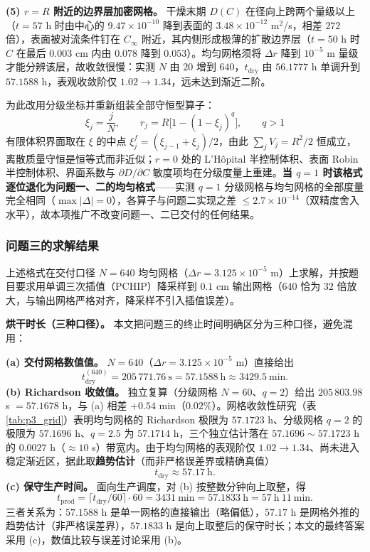 \textbf{(5) $r=R$ 附近的边界层加密网格。} 干燥末期 $D(C)$ 在径向上跨两个量级以上（$t=57$ h 时由中心的 $9.47\times10^{-10}$ 降到表面的 $3.48\times10^{-12}$ m$^2$/s，相差 $272$ 倍），表面被对流条件钉在 $C_\infty$ 附近，其内侧形成极薄的扩散边界层（$t=50$ h 时 $C$ 在最后 $0.003$ cm 内由 $0.078$ 降到 $0.053$）。均匀网格须将 $\Delta r$ 降到 $10^{-5}$ m 量级才能分辨该层，故收敛很慢：实测 $N$ 由 $20$ 增到 $640$，$t_{\text{dry}}$ 由 $56.1777$ h 单调升到 $57.1588$ h，表观收敛阶仅 $1.02\to1.34$，远未达到渐近二阶。

为此改用分级坐标并重新组装全部守恒型算子：
\begin{equation}
  \xi_j=\frac{j}{N},\qquad r_j=R\big[1-(1-\xi_j)^q\big],\qquad q>1
  \label{eq:p3_grid}
\end{equation}
有限体积界面取在 $\xi$ 的中点 $\xi^f_j=(\xi_{j-1}+\xi_j)/2$，由此 $\sum_jV_j=R^2/2$ 恒成立，离散质量守恒是恒等式而非近似；$r=0$ 处的 L'Hôpital 半控制体积、表面 Robin 半控制体积、界面系数与 $\partial D/\partial C$ 敏度项均在分级度量上重建。\textbf{当 $q=1$ 时该格式逐位退化为问题一、二的均匀格式}——实测 $q=1$ 分级网格与均匀网格的全部度量完全相同（$\max|\Delta|=0$），各算子与问题二实现之差 $\le2.7\times10^{-14}$（双精度舍入水平），故本项推广不改变问题一、二已交付的任何结果。

\subsubsection{问题三的求解结果}

上述格式在交付口径 $N=640$ 均匀网格（$\Delta r=3.125\times10^{-5}$ m）上求解，并按题目要求用单调三次插值（PCHIP）降采样到 $0.1$ cm 输出网格（$640$ 恰为 $32$ 倍放大，与输出网格严格对齐，降采样不引入插值误差）。

\textbf{烘干时长（三种口径）。} 本文把问题三的终止时间明确区分为三种口径，避免混用：

\textbf{(a) 交付网格数值值。} $N=640$（$\Delta r=3.125\times10^{-5}$ m）直接给出
\begin{equation}
  t_{\text{dry}}^{(640)}=205\,771.76\ \text{s}=57.1588\ \text{h}\approx3429.5\ \text{min}.
\end{equation}
\textbf{(b) Richardson 收敛值。} 独立复算（分级网格 $N=60$、$q=2$）给出 $205\,803.98$ s $=57.1678$ h，与 (a) 相差 $+0.54$ min（$0.02\%$）。网格收敛性研究（表 \ref{tab:p3_grid}）表明均匀网格的 Richardson 极限为 $57.1723$ h、分级网格 $q=2$ 的极限为 $57.1696$ h、$q=2.5$ 为 $57.1714$ h，三个独立估计落在 $57.1696\sim57.1723$ h 的 $0.0027$ h（$\approx10$ s）带宽内。由于均匀网格的表观阶仅 $1.02\to1.34$、尚未进入稳定渐近区，据此取\textbf{趋势估计}（而非严格误差界或精确真值）
\begin{equation}
  t_{\text{dry}}\approx57.17\ \text{h}.
  \label{eq:p3_tdry}
\end{equation}
\textbf{(c) 保守生产时间。} 面向生产调度，对 (b) 按整数分钟向上取整，得
\begin{equation}
  t_{\text{prod}}=\lceil t_{\text{dry}}/60\rceil\cdot60=3431\ \text{min}=57.1833\ \text{h}=57\ \text{h}\ 11\ \text{min}.
\end{equation}
三者关系为：$57.1588$ h 是单一网格的直接输出（略偏低），$57.17$ h 是网格外推的趋势估计（非严格误差界），$57.1833$ h 是向上取整后的保守时长；本文的最终答案采用 (c)，数值比较与误差讨论采用 (b)。

